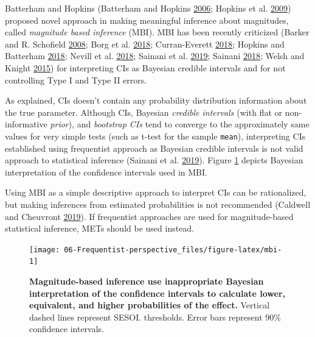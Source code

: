 \documentclass[
]{book}
\begin{document}
Batterham and Hopkins (Batterham and Hopkins \protect\hyperlink{ref-batterhamMakingMeaningfulInferences2006}{2006}; Hopkins et al. \protect\hyperlink{ref-hopkinsProgressiveStatisticsStudies2009}{2009}) proposed novel approach in making meaningful inference about magnitudes, called \emph{magnitude based inference} (MBI). MBI has been recently criticized (Barker and R. Schofield \protect\hyperlink{ref-barkerInferenceMagnitudesEffects2008}{2008}; Borg et al. \protect\hyperlink{ref-borgBayesianMethodsMight2018}{2018}; Curran-Everett \protect\hyperlink{ref-curran-everettMagnitudebasedInferenceGood2018}{2018}; Hopkins and Batterham \protect\hyperlink{ref-hopkinsVindicationMagnitudeBasedInference2018}{2018}; Nevill et al. \protect\hyperlink{ref-nevillCanWeTrust2018}{2018}; Sainani et al. \protect\hyperlink{ref-sainaniMagnitudeBasedInference2019}{2019}; Sainani \protect\hyperlink{ref-sainaniProblemMagnitudebasedInference2018}{2018}; Welsh and Knight \protect\hyperlink{ref-welshMagnitudebasedInferenceStatistical2015}{2015}) for interpreting CIs as Bayesian credible intervals and for not controlling Type I and Type II errors.

As explained, CIs doesn't contain any probability distribution information about the true parameter. Although CIs, Bayesian \emph{credible intervals} (with flat or non-informative \emph{prior}), and \emph{bootstrap CIs} tend to converge to the approximately same values for very simple tests (such as t-test for the sample \texttt{mean}), interpreting CIs established using frequentist approach as Bayesian credible intervals is not valid approach to statistical inference (Sainani et al. \protect\hyperlink{ref-sainaniMagnitudeBasedInference2019}{2019}). Figure \ref{fig:mbi} depicts Bayesian interpretation of the confidence intervals used in MBI.

Using MBI as a simple descriptive approach to interpret CIs can be rationalized, but making inferences from estimated probabilities is not recommended (Caldwell and Cheuvront \protect\hyperlink{ref-caldwellBasicStatisticalConsiderations2019}{2019}). If frequentist approaches are used for magnitude-based statistical inference, METs should be used instead.

\begin{figure}

{\centering \texttt{[image: 06-Frequentist-perspective\_files/figure-latex/mbi-1]} 

}

\caption{\textbf{Magnitude-based inference use inappropriate Bayesian interpretation of the confidence intervals to calculate lower, equivalent, and higher probabilities of the effect. }Vertical dashed lines represent SESOI. thresholds. Error bars represent 90\% confidence intervals.}\label{fig:mbi}
\end{figure}
\end{document}
